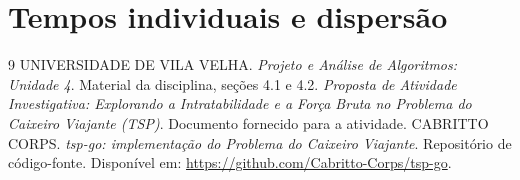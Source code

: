 \documentclass[12pt,a4paper]{article}
\begin{document}
\clearpage
\appendix
\section{Tempos individuais e dispersão}\label{ap:amostras}


\clearpage
\begin{thebibliography}{9}
 UNIVERSIDADE DE VILA VELHA. \textit{Projeto e Análise de Algoritmos: Unidade 4}. Material da disciplina, seções 4.1 e 4.2.
 \textit{Proposta de Atividade Investigativa: Explorando a Intratabilidade e a Força Bruta no Problema do Caixeiro Viajante (TSP)}. Documento fornecido para a atividade.
 CABRITTO CORPS. \textit{tsp-go: implementação do Problema do Caixeiro Viajante}. Repositório de código-fonte. Disponível em: \url{https://github.com/Cabritto-Corps/tsp-go}.
\end{thebibliography}
\end{document}
